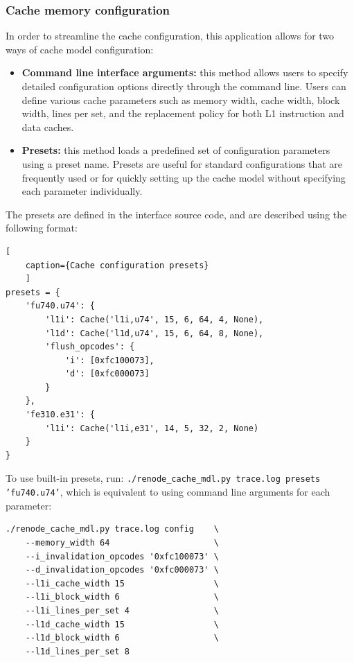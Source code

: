 \subsubsection*{Cache memory configuration}

In order to streamline the cache configuration, this application allows for two ways of cache model configuration:
\begin{itemize}
    \item \textbf{Command line interface arguments:} this method allows users to specify detailed configuration options directly through the command line. Users can define various
        cache parameters such as memory width, cache width, block width, lines per set, and the replacement policy for both L1 instruction and data caches.
    \item \textbf{Presets:} this method loads a predefined set of configuration parameters using a preset name. Presets are useful for standard configurations that are frequently used or
        for quickly setting up the cache model without specifying each parameter individually.
\end{itemize}

\noindent The presets are defined in the interface source code, and are described using the following format:
\begin{center}
\centering
\begin{minipage}{\linewidth}
\begin{lstlisting}[
    caption={Cache configuration presets}
    ]
presets = {
    'fu740.u74': {
        'l1i': Cache('l1i,u74', 15, 6, 64, 4, None),
        'l1d': Cache('l1d,u74', 15, 6, 64, 8, None),
        'flush_opcodes': {
            'i': [0xfc100073],
            'd': [0xfc000073]
        }
    },
    'fe310.e31': {
        'l1i': Cache('l1i,e31', 14, 5, 32, 2, None)
    }
}
\end{lstlisting}
\end{minipage}
\end{center}

\noindent To use built-in presets, run: \texttt{./renode\_cache\_mdl.py trace.log presets 'fu740.u74'}, which is equivalent to using command line arguments for each parameter:

\begin{verbatim}
./renode_cache_mdl.py trace.log config    \
    --memory_width 64                     \
    --i_invalidation_opcodes '0xfc100073' \
    --d_invalidation_opcodes '0xfc000073' \
    --l1i_cache_width 15                  \
    --l1i_block_width 6                   \
    --l1i_lines_per_set 4                 \
    --l1d_cache_width 15                  \
    --l1d_block_width 6                   \
    --l1d_lines_per_set 8
\end{verbatim}

